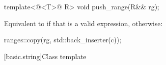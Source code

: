 \documentclass{wg21}
\begin{document}
\begin{addedblock}
\begin{itemdecl}
template<@<T>@ R>
void push_range(R&& rg);
\end{itemdecl}

\begin{itemdescr}
    \pnum
    \effects
    Equivalent to  if that is a valid expression,
    otherwise:
    \begin{codeblock}
        ranges::copy(rg, std::back_inserter(c));
    \end{codeblock}
\end{itemdescr}
\end{addedblock}

[basic.string]{Class template }
\end{document}
